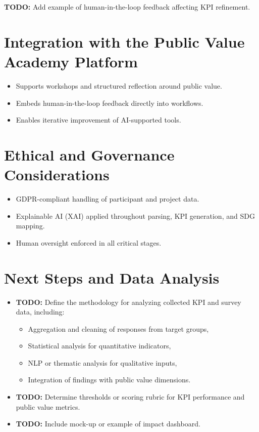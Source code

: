 \textbf{TODO:} Add example of human-in-the-loop feedback affecting KPI refinement.

\section{Integration with the Public Value Academy Platform}\label{sec:integration-platform}

\begin{itemize}
    \item Supports workshops and structured reflection around public value.
    \item Embeds human-in-the-loop feedback directly into workflows.
    \item Enables iterative improvement of AI-supported tools.
\end{itemize}

\section{Ethical and Governance Considerations}\label{sec:ethical-governance}

\begin{itemize}
    \item GDPR-compliant handling of participant and project data.
    \item Explainable AI (XAI) applied throughout parsing, KPI generation, and SDG mapping.
    \item Human oversight enforced in all critical stages.
\end{itemize}

\section{Next Steps and Data Analysis}\label{sec:next-steps}

\begin{itemize}
    \item \textbf{TODO:} Define the methodology for analyzing collected KPI and survey data, including:
        \begin{itemize}
            \item Aggregation and cleaning of responses from target groups,
            \item Statistical analysis for quantitative indicators,
            \item NLP or thematic analysis for qualitative inputs,
            \item Integration of findings with public value dimensions.
        \end{itemize}
    \item \textbf{TODO:} Determine thresholds or scoring rubric for KPI performance and public value metrics.
    \item \textbf{TODO:} Include mock-up or example of impact dashboard.
\end{itemize}

